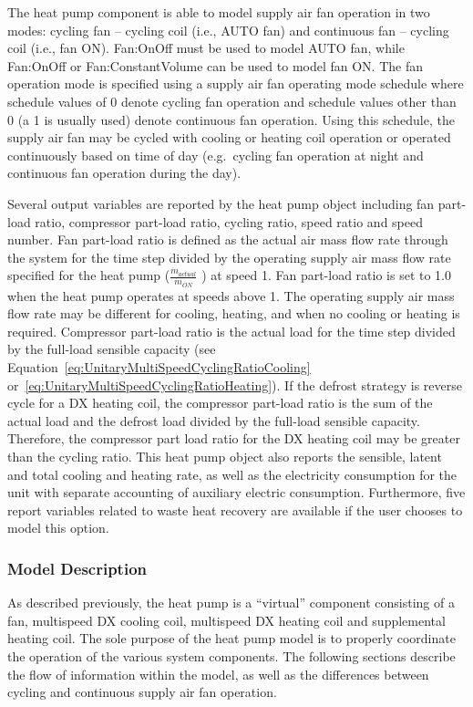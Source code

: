 The heat pump component is able to model supply air fan operation in two modes: cycling fan -- cycling coil (i.e., AUTO fan) and continuous fan -- cycling coil (i.e., fan ON). Fan:OnOff must be used to model AUTO fan, while Fan:OnOff or Fan:ConstantVolume can be used to model fan ON. The fan operation mode is specified using a supply air fan operating mode schedule where schedule values of 0 denote cycling fan operation and schedule values other than 0 (a 1 is usually used) denote continuous fan operation. Using this schedule, the supply air fan may be cycled with cooling or heating coil operation or operated continuously based on time of day (e.g.~cycling fan operation at night and continuous fan operation during the day).

Several output variables are reported by the heat pump object including fan part-load ratio, compressor part-load ratio, cycling ratio, speed ratio and speed number. Fan part-load ratio is defined as the actual air mass flow rate through the system for the time step divided by the operating supply air mass flow rate specified for the heat pump (\({\frac{{{{\dot m}_{actual}}}}{{{\dot m}_{ON}}}}\) ) at speed 1. Fan part-load ratio is set to 1.0 when the heat pump operates at speeds above 1. The operating supply air mass flow rate may be different for cooling, heating, and when no cooling or heating is required. Compressor part-load ratio is the actual load for the time step divided by the full-load sensible capacity (see Equation~\ref{eq:UnitaryMultiSpeedCyclingRatioCooling} or~\ref{eq:UnitaryMultiSpeedCyclingRatioHeating}). If the defrost strategy is reverse cycle for a DX heating coil, the compressor part-load ratio is the sum of the actual load and the defrost load divided by the full-load sensible capacity. Therefore, the compressor part load ratio for the DX heating coil may be greater than the cycling ratio. This heat pump object also reports the sensible, latent and total cooling and heating rate, as well as the electricity consumption for the unit with separate accounting of auxiliary electric consumption. Furthermore, five report variables related to waste heat recovery are available if the user chooses to model this option.

\subsubsection{Model Description}\label{model-description-4}

As described previously, the heat pump is a ``virtual'' component consisting of a fan, multispeed DX cooling coil, multispeed DX heating coil and supplemental heating coil. The sole purpose of the heat pump model is to properly coordinate the operation of the various system components. The following sections describe the flow of information within the model, as well as the differences between cycling and continuous supply air fan operation.

